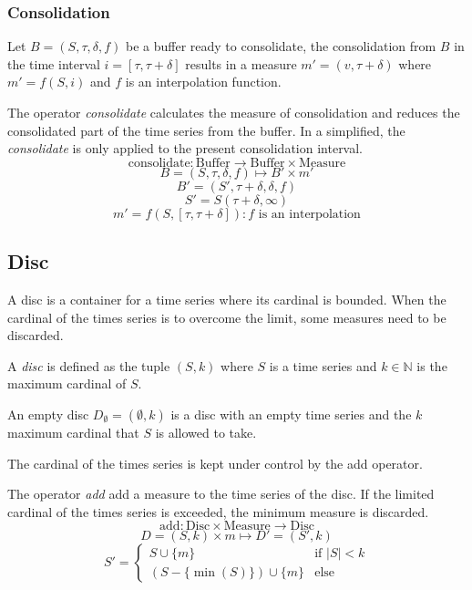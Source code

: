 \subsubsection{Consolidation}

Let $B=(S,\tau,\delta,f)$ be a buffer ready to consolidate, the
consolidation from $B$ in the time interval $i=[\tau,\tau+\delta]$
results in a measure $m'=(v,\tau+\delta)$ where $m'=f(S,i)$ and $f$ is
an interpolation function.

\begin{definition}
  The operator \emph{consolidate} calculates the measure of
  consolidation and reduces the consolidated part of the time series
  from the buffer. In a simplified, the \emph{consolidate} is only
  applied to the present consolidation interval.
  \[
  \text{consolidate}: \text{Buffer} \longrightarrow \text{Buffer}
  \times \text{Measure}
  \]
  \[
  B=(S,\tau,\delta,f) \mapsto B' \times m'
  \]
  \[
  B'= (S',\tau+\delta,\delta,f)
  \]
  \[
  S' = S(\tau+\delta,\infty)
  \]
  \[
  m' = f(S,[\tau,\tau+\delta]): f \text{ is an interpolation}
  \]
\end{definition}



\subsection{Disc}\label{sec:model:disc}

A disc is a container for a time series where its
cardinal is bounded. When the cardinal of the times series is to overcome the limit, some measures need to be discarded. 

\begin{definition}[Disc]
  A \emph{disc} is defined as the tuple $(S,k)$ where $S$ is a time
  series and $k\in\mathbb{N}$ is the maximum cardinal of $S$.
\end{definition}

An empty disc $D_{\emptyset} = (\emptyset,k)$ is a disc with an empty
time series and the $k$ maximum cardinal that $S$ is allowed to take.

 The cardinal of the times series is kept under control by the add operator. 

\begin{definition}
  The operator \emph{add} add a measure to the time series of the
  disc. If the limited cardinal of the times series is exceeded, the
  minimum measure is discarded.
  \[
  \text{add}: \text{Disc} \times \text{Measure} \longrightarrow \text{Disc}
  \]
  \[
  D=(S,k) \times m \mapsto D'= (S',k)
  \]
  \[
  S' =  
  \begin{cases}
      S\cup\{m\} &\text{if }  |S|<k\\
      (S-\{\min(S)\}) \cup \{m\} & \text{else }
    \end{cases}  
  \]
\end{definition}



